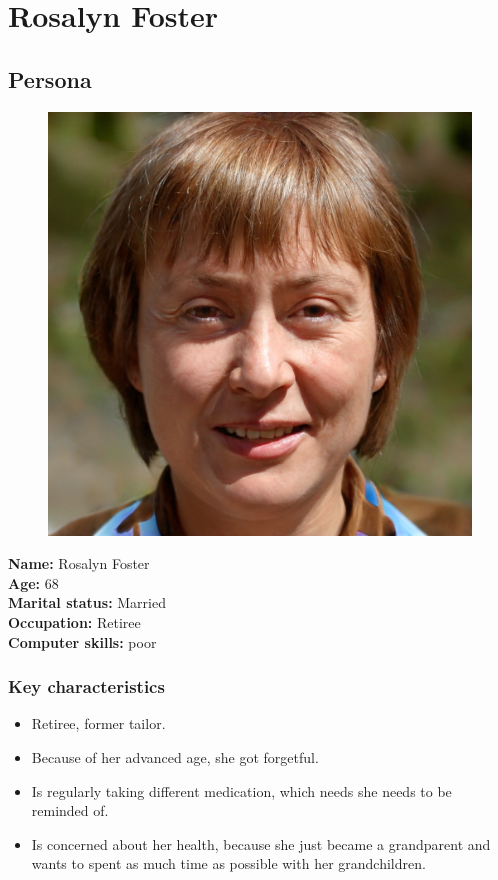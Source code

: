 \documentclass[12pt, a4paper, ngerman]{article}
\begin{document}
\section*{Rosalyn Foster}
\subsection*{Persona}

\begin{figure}[htp]
\centering
  \includegraphics[height=0.5\textwidth]{images/persona01.jpg}
\end{figure}
\let\thefootnote\relax{}

\textbf{Name:} Rosalyn Foster \\
\textbf{Age:} 68 \\
\textbf{Marital status:} Married \\
\textbf{Occupation:} Retiree  \\
\textbf{Computer skills:} poor

\subsubsection*{Key characteristics}

\begin{itemize}[noitemsep]
	\item Retiree, former tailor.
	\item Because of her advanced age, she got forgetful.
	\item Is regularly taking different medication, which needs she needs to be reminded of.
	\item Is concerned about her health, because she just became a grandparent and wants to spent as much time as possible with her grandchildren.
\end{itemize}
\end{document}
